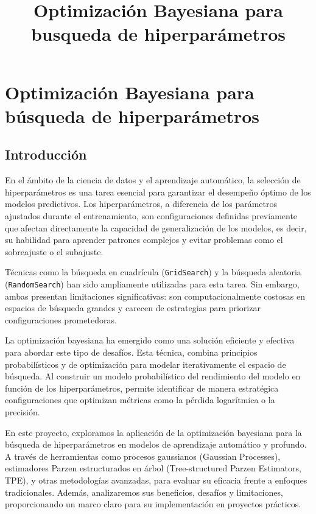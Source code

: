 \documentclass[
  12pt,
  letterpaper,
  DIV=11,
  numbers=noendperiod]{scrartcl}
\title{Optimización Bayesiana para busqueda de hiperparámetros}
\author{}
\date{}
\renewcommand*\contentsname{Table of contents}
\newcommand\contentsname{Table of contents}
\begin{document}
\maketitle

\renewcommand*\contentsname{Índice}
{
\hypersetup{linkcolor=}
\setcounter{tocdepth}{3}
\tableofcontents
}

\newpage

\section{Optimización Bayesiana para búsqueda de
hiperparámetros}\label{optimizaciuxf3n-bayesiana-para-buxfasqueda-de-hiperparuxe1metros}

\subsection{Introducción}\label{introducciuxf3n}

En el ámbito de la ciencia de datos y el aprendizaje automático, la
selección de hiperparámetros es una tarea esencial para garantizar el
desempeño óptimo de los modelos predictivos. Los hiperparámetros, a
diferencia de los parámetros ajustados durante el entrenamiento, son
configuraciones definidas previamente que afectan directamente la
capacidad de generalización de los modelos, es decir, su habilidad para
aprender patrones complejos y evitar problemas como el sobreajuste o el
subajuste.

Técnicas como la búsqueda en cuadrícula (\texttt{GridSearch}) y la
búsqueda aleatoria (\texttt{RandomSearch}) han sido ampliamente
utilizadas para esta tarea. Sin embargo, ambas presentan limitaciones
significativas: son computacionalmente costosas en espacios de búsqueda
grandes y carecen de estrategias para priorizar configuraciones
prometedoras.

La optimización bayesiana ha emergido como una solución eficiente y
efectiva para abordar este tipo de desafíos. Esta técnica, combina
principios probabilísticos y de optimización para modelar iterativamente
el espacio de búsqueda. Al construir un modelo probabilístico del
rendimiento del modelo en función de los hiperparámetros, permite
identificar de manera estratégica configuraciones que optimizan métricas
como la pérdida logarítmica o la precisión.

En este proyecto, exploramos la aplicación de la optimización bayesiana
para la búsqueda de hiperparámetros en modelos de aprendizaje automático
y profundo. A través de herramientas como procesos gaussianos (Gaussian
Processes), estimadores Parzen estructurados en árbol (Tree-structured
Parzen Estimators, TPE), y otras metodologías avanzadas, para evaluar su
eficacia frente a enfoques tradicionales. Además, analizaremos sus
beneficios, desafíos y limitaciones, proporcionando un marco claro para
su implementación en proyectos prácticos.
\end{document}
